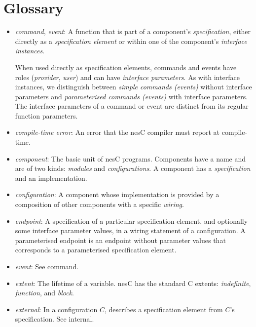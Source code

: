 \documentclass[11pt]{article}
\newcommand{\nesc}{nesC\xspace}
\begin{document}
\section{Glossary}
\label{sec:glossary}

\begin{itemize}

\item \emph{command}, \emph{event}: A function that is part of a
component's \emph{specification}, either directly as a \emph{specification
element} or within one of the component's \emph{interface instances}.

When used directly as specification elements, commands and events have
roles (\emph{provider}, \emph{user}) and can have \emph{interface
parameters}. As with interface instances, we distinguish between
\emph{simple commands (events)} without interface parameters and
\emph{parameterised commands (events)} with interface parameters. The
interface parameters of a command or event are distinct from its regular
function parameters.

\item \emph{compile-time error}: An error that the \nesc compiler must
report at compile-time.

\item \emph{component}: The basic unit of \nesc programs. Components have a
name and are of two kinds: \emph{modules} and \emph{configurations}. A
component has a \emph{specification} and an implementation. 

\item \emph{configuration}: A component whose implementation is provided
by a composition of other components with a specific \emph{wiring}.

\item \emph{endpoint}: A specification of a particular specification
element, and optionally some interface parameter values, in a wiring
statement of a configuration. A parameterised endpoint is an endpoint
without parameter values that corresponds to a parameterised specification
element.

\item \emph{event}: See command.

\item \emph{extent}: The lifetime of a variable. \nesc has the standard C
extents: \emph{indefinite}, \emph{function}, and \emph{block}.

\item \emph{external}: In a configuration $C$, describes a specification
element from $C$'s specification. See internal.


\end{itemize}
\end{document}
